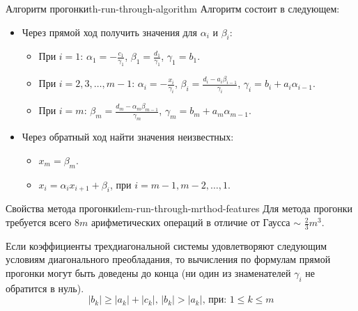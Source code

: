 \documentclass[14pt]{extarticle}
\begin{document}
        \begin{theorem}{Алгоритм прогонки}{th-run-through-algorithm}
            Алгоритм состоит в следующем:
            \begin{itemize}
                \item Через прямой ход получить значения для $\alpha_{i}$ и $\beta_{i}$:
                      \begin{itemize}
                          \item При $i = 1$: $\alpha_{1} = -\frac{c_{1}}{\gamma_{1}}$, $\beta_{1} = \frac{d_{1}}{\gamma_{1}}$, $\gamma_{1} = b_{1}$.
                          \item При $i = 2, 3, \ldots, m-1$: $\alpha_{i} = -\frac{x_{i}}{\gamma_{i}}$, $\beta_{i} = \frac{d_{i} - a_{i}\beta_{i-1}}{\gamma_{i}}$, $\gamma_{i} = b_{i} + a_{i}\alpha_{i-1}$.
                          \item При $i = m$: $\beta_{m} = \frac{d_{m} - \alpha_{m}\beta_{m-1}}{\gamma_{m}}$, $\gamma_{m} = b_{m} + a_{m}\alpha_{m-1}$.
                      \end{itemize}
                \item Через обратный ход найти значения неизвестных:
                      \begin{itemize}
                          \item $x_{m} = \beta_{m}$.
                          \item $x_{i} = \alpha_{i}x_{i+1} + \beta_{i}$, при $i = m-1, m-2, \ldots, 1$.
                      \end{itemize}
            \end{itemize}
        \end{theorem}

        \begin{lemma}{Свойства метода прогонки}{lem-run-through-mrthod-features}
            Для метода прогонки требуется всего $8m$ арифметических операций в отличие от Гаусса $\sim$ $\frac{2}{3}m^{3}$.

            \vspace{\baselineskip}

            Если коэффициенты трехдиагональной системы удовлетворяют следующим условиям диагонального преобладания, то вычисления по формулам прямой прогонки могут быть доведены до конца (ни один из знаменателей $\gamma_{i}$ не обратится в нуль).
            $$|b_{k}| \geq |a_{k}| + |c_{k}| \text{, } |b_{k}| > |a_{k}| \text{, при: } 1 \leq k \leq m$$
        \end{lemma}
\end{document}
